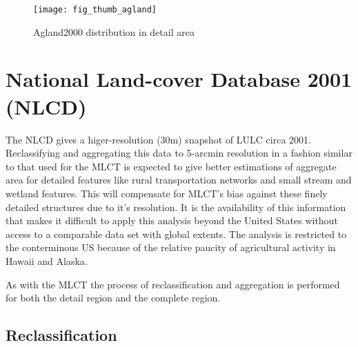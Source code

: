 \begin{figure} 
\begin{center}
  

\texttt{[image: fig\_thumb\_agland]}
\end{center} 
\caption{Agland2000 distribution in detail area}
\label{fig:thumb_agland} 
\end{figure} 


\begin{comment}
\section{Major Land Uses (MLU)}
\label{sec:mlu}

This is a tabular data set published by the Economic Research Service
(ERS) at the USDA of land acreages by various uses and covers at a
state level.  We hope to compare our results to this data on a
state-by-state basis in order as a check and possibly incorporate some
of its information as a refinement.

\end{comment}

\section{National Land-cover Database 2001 (NLCD)}
\label{sec:nlcd}

\citet{Homer2004}


The NLCD gives a higer-resolution (30m) snapshot of LULC circa 2001.
 Reclassifying and aggregating this data to 5-arcmin
resolution in a fashion similar to that used for the MLCT is expected
to give better estimations of aggregate area for detailed features
like rural transportation networks and small stream and wetland
features.  This will compensate for MLCT's bias against these finely
detailed structures due to it's resolution.  It is the availability of
this information that makes it difficult to apply this analysis beyond
the United States without access to a comparable data set with global
extents.  The analysis is restricted to the conterminous US because of
the relative paucity of agricultural activity in Hawaii and Alaska.

As with the MLCT the process of reclassification and aggregation is
performed for both the detail region and the complete region.


\subsection{Reclassification}
\label{sec:nlcd-reclass}

